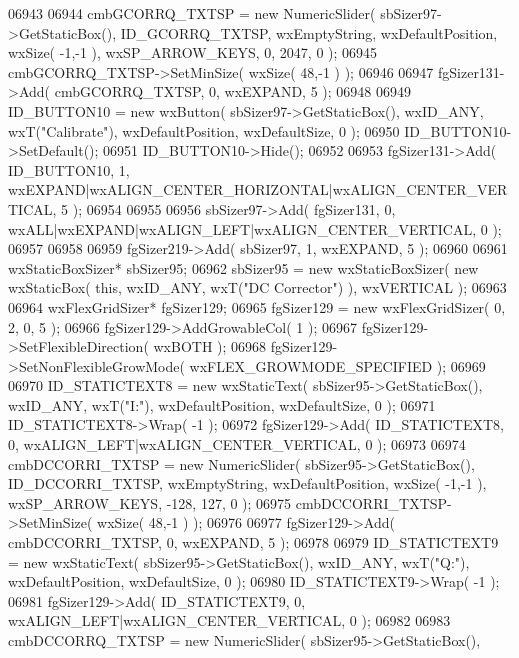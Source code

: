 \begin{DoxyCode}
06943     
06944     cmbGCORRQ_TXTSP = \textcolor{keyword}{new} NumericSlider( sbSizer97->GetStaticBox(), 
      ID_GCORRQ_TXTSP, wxEmptyString, wxDefaultPosition, wxSize( -1,-1 ), wxSP\_ARROW\_KEYS, 0, 2047, 0 );
06945     cmbGCORRQ_TXTSP->SetMinSize( wxSize( 48,-1 ) );
06946     
06947     fgSizer131->Add( cmbGCORRQ_TXTSP, 0, wxEXPAND, 5 );
06948     
06949     ID_BUTTON10 = \textcolor{keyword}{new} wxButton( sbSizer97->GetStaticBox(), wxID\_ANY, wxT(\textcolor{stringliteral}{"Calibrate"}), wxDefaultPosition, 
      wxDefaultSize, 0 );
06950     ID_BUTTON10->SetDefault(); 
06951     ID_BUTTON10->Hide();
06952     
06953     fgSizer131->Add( ID_BUTTON10, 1, wxEXPAND|wxALIGN\_CENTER\_HORIZONTAL|wxALIGN\_CENTER\_VERTICAL, 5 );
06954     
06955     
06956     sbSizer97->Add( fgSizer131, 0, wxALL|wxEXPAND|wxALIGN\_LEFT|wxALIGN\_CENTER\_VERTICAL, 0 );
06957     
06958     
06959     fgSizer219->Add( sbSizer97, 1, wxEXPAND, 5 );
06960     
06961     wxStaticBoxSizer* sbSizer95;
06962     sbSizer95 = \textcolor{keyword}{new} wxStaticBoxSizer( \textcolor{keyword}{new} wxStaticBox( \textcolor{keyword}{this}, wxID\_ANY, wxT(\textcolor{stringliteral}{"DC Corrector"}) ), wxVERTICAL );
06963     
06964     wxFlexGridSizer* fgSizer129;
06965     fgSizer129 = \textcolor{keyword}{new} wxFlexGridSizer( 0, 2, 0, 5 );
06966     fgSizer129->AddGrowableCol( 1 );
06967     fgSizer129->SetFlexibleDirection( wxBOTH );
06968     fgSizer129->SetNonFlexibleGrowMode( wxFLEX\_GROWMODE\_SPECIFIED );
06969     
06970     ID_STATICTEXT8 = \textcolor{keyword}{new} wxStaticText( sbSizer95->GetStaticBox(), wxID\_ANY, wxT(\textcolor{stringliteral}{"I:"}), wxDefaultPosition, 
      wxDefaultSize, 0 );
06971     ID_STATICTEXT8->Wrap( -1 );
06972     fgSizer129->Add( ID_STATICTEXT8, 0, wxALIGN\_LEFT|wxALIGN\_CENTER\_VERTICAL, 0 );
06973     
06974     cmbDCCORRI_TXTSP = \textcolor{keyword}{new} NumericSlider( sbSizer95->GetStaticBox(), 
      ID_DCCORRI_TXTSP, wxEmptyString, wxDefaultPosition, wxSize( -1,-1 ), wxSP\_ARROW\_KEYS, -128, 127, 0 );
06975     cmbDCCORRI_TXTSP->SetMinSize( wxSize( 48,-1 ) );
06976     
06977     fgSizer129->Add( cmbDCCORRI_TXTSP, 0, wxEXPAND, 5 );
06978     
06979     ID_STATICTEXT9 = \textcolor{keyword}{new} wxStaticText( sbSizer95->GetStaticBox(), wxID\_ANY, wxT(\textcolor{stringliteral}{"Q:"}), wxDefaultPosition, 
      wxDefaultSize, 0 );
06980     ID_STATICTEXT9->Wrap( -1 );
06981     fgSizer129->Add( ID_STATICTEXT9, 0, wxALIGN\_LEFT|wxALIGN\_CENTER\_VERTICAL, 0 );
06982     
06983     cmbDCCORRQ_TXTSP = \textcolor{keyword}{new} NumericSlider( sbSizer95->GetStaticBox(), 

\end{DoxyCode}
